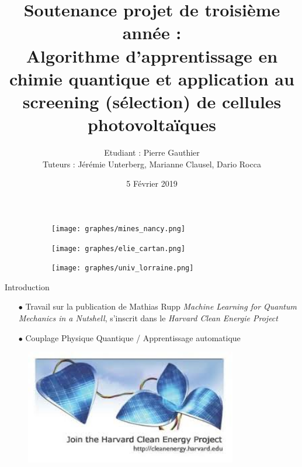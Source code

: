\documentclass{beamer}
\title{Soutenance projet de troisième année : \\
  Algorithme d'apprentissage en chimie quantique et application au screening (sélection) de cellules photovoltaïques}
\author{Etudiant : Pierre Gauthier\institute{École Mines Nancy}\\
  Tuteurs : Jérémie Unterberg, Marianne Clausel, Dario Rocca}
\date{5 Février 2019}
\begin{document}
  \begin{frame}
  	
  	
	\begin{figure}[!h]
	\centering	
		\begin{subfigure}[b]{0.3\textwidth}
		\texttt{[image: graphes/mines\_nancy.png]}
		\end{subfigure}
		\begin{subfigure}[b]{0.3\textwidth}
		\texttt{[image: graphes/elie\_cartan.png]}
		\end{subfigure}
		\begin{subfigure}[b]{0.3\textwidth}
		\texttt{[image: graphes/univ\_lorraine.png]}
	\end{subfigure}
	\end{figure}
	
  \titlepage
  \end{frame}

 

\begin{frame}{Introduction}
\begin{itemize}
\item[$\bullet$] Travail sur la publication de Mathias Rupp \textit{Machine Learning for Quantum Mechanics in a Nutshell},  s'inscrit dans le \textit{Harvard Clean Energie Project}
\item[$\bullet$]  Couplage Physique Quantique / Apprentissage automatique
\end{itemize}
\begin{center}
\begin{figure}[!h]
\includegraphics[height = 5cm, keepaspectratio]{graphes/harvard.png}
		\end{figure}
\end{center}
\end{frame}
\begin{frame}
   \tableofcontents
\end{frame}
\end{document}
